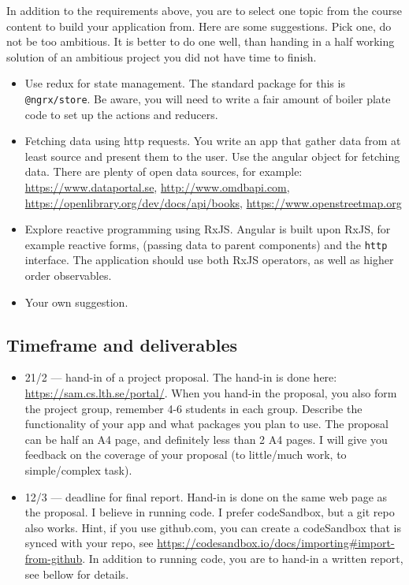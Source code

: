 \documentclass[fleqn, article, a4paper]{memoir}
\begin{document}
\noindent In addition to the requirements above, you are to select one topic from the course content to build your application from. Here are some suggestions. Pick one, do not be too ambitious. It is better to do one well, than handing in a half working solution of an ambitious project you did not have time to finish.
\begin{itemize}
\item Use redux for state management. The standard package for this is \texttt{@ngrx/store}. Be aware, you will need to write a fair amount of boiler plate code to set up the actions and reducers.
\item Fetching data using http requests. You write an app that gather data from at least source and present them to the user. Use the angular  object for fetching data. There are plenty of open data sources, for example: \url{https://www.dataportal.se}, \url{http://www.omdbapi.com}, \url{https://openlibrary.org/dev/docs/api/books}, \url{https://www.openstreetmap.org}
\item Explore reactive programming using RxJS. Angular is built upon RxJS, for example reactive forms,  (passing data to parent components) and the \texttt{http} interface. The application should use both RxJS operators, as well as higher order observables.
\item Your own suggestion. 
\end{itemize}

\subsection*{Timeframe and deliverables}

\begin{itemize}
\item 21/2 --- hand-in of a project proposal. The hand-in is done here: \url{https://sam.cs.lth.se/portal/}. When you hand-in the proposal, you also form the project group, remember 4-6 students in each group. Describe the functionality of your app and what packages you plan to use. The proposal can be half an A4 page, and definitely less than 2 A4 pages. I will give you feedback on the coverage of your proposal (to little/much work, to simple/complex task).
\item 12/3 --- deadline for final report. Hand-in is done on the same web page as the proposal. I believe in running code. I prefer codeSandbox, but a git repo also works. Hint, if you use github.com, you can create a codeSandbox that is synced with your repo, see \url{https://codesandbox.io/docs/importing#import-from-github}. In addition to running code, you are to hand-in a written report, see bellow for details.
\end{itemize}
\end{document}
